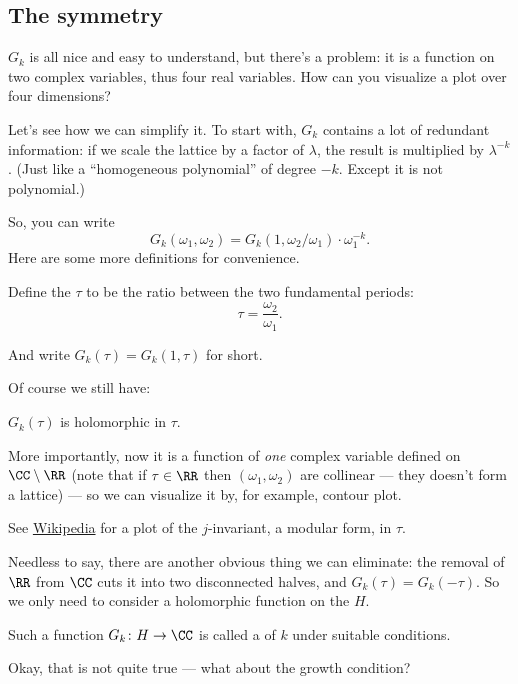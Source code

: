 \subsection{The symmetry}

$G_k$ is all nice and easy to understand, but there's a problem: it is a function on two complex
variables, thus four real variables. How can you visualize a plot over four dimensions?

Let's see how we can simplify it. To start with, $G_k$ contains a lot of redundant information:
if we scale the lattice by a factor of $\lambda$, the result is multiplied by $\lambda^{-k}$.
(Just like a ``homogeneous polynomial'' of degree $-k$. Except it is not polynomial.)

So, you can write
\[ G_k(\omega_1, \omega_2) = G_k(1, \omega_2/\omega_1) \cdot \omega_1^{-k}. \]
Here are some more definitions for convenience.
\begin{definition}
	Define the  $\tau$ to be the ratio between the two fundamental periods:
	\[ \tau = \frac{\omega_2}{\omega_1}. \]
\end{definition}
And write $G_k(\tau) = G_k(1, \tau)$ for short.

Of course we still have:
\begin{claim}
	$G_k(\tau)$ is holomorphic in $\tau$.
\end{claim}

More importantly, now it is a function of \emph{one} complex variable defined on $\CC \setminus \RR$
(note that if $\tau \in \RR$ then $(\omega_1, \omega_2)$ are collinear --- they doesn't form a
lattice) --- so we can visualize it by, for example, contour plot.

See \href{https://commons.wikimedia.org/wiki/File:KleinInvariantJ.jpg}{Wikipedia} for a plot of the
$j$-invariant, a modular form, in $\tau$.

Needless to say, there are another obvious thing we can eliminate:
the removal of $\RR$ from $\CC$ cuts it into two disconnected halves, and $G_k(\tau) =
G_k(-\tau)$. So we only need to consider a holomorphic function
on the  $H$.

\begin{definition}
	Such a function $G_k\colon H \to \CC$ is called a  of  $k$
	under suitable conditions.
\end{definition}

Okay, that is not quite true --- what about the growth condition?

